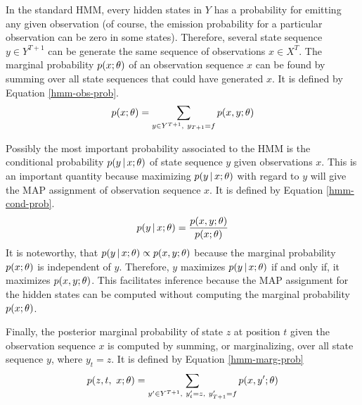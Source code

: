 In the standard HMM, every hidden states in $Y$ has a probability for
emitting any given observation (of course, the emission probability
for a particular observation can be zero in some states). Therefore,
several state sequence $y \in Y^{T+1}$ can be generate the same
sequence of observations $x \in X^T$. The marginal probability
$p(x\mbox{$ ; \, $}\theta)$ of an observation sequence $x$ can be found by
summing over all state sequences that could have generated $x$. It is
defined by Equation \eqref{hmm-obs-prob}.
\begin{equation}
p(x\parcond\theta) = \sum_{y \in Y^{T+1},\ y_{T+1} = f} p(x, y\parcond \theta)\label{hmm-obs-prob}
\end{equation}

Possibly the most important probability associated to the HMM is the
conditional probability $p(y\mbox{$ \, | \, $} x\mbox{$ ; \, $}\theta)$ of state sequence $y$
given observations $x$. This is an important quantity because
maximizing $p(y\mbox{$ \, | \, $} x\mbox{$ ; \, $}\theta)$ with regard to $y$ will give the MAP
assignment of observation sequence $x$. It is defined by Equation
\eqref{hmm-cond-prob}.
\begin{equation}
p(y\mbox{$ \, | \, $} x\mbox{$ ; \, $}\theta) = \frac{p(x,y\mbox{$ ; \, $}\theta)}{p(x\mbox{$ ; \, $}\theta)}\label{hmm-cond-prob}
\end{equation}
It is noteworthy, that $p(y\mbox{$ \, | \, $} x\mbox{$ ; \, $}\theta) \propto p(x,y\mbox{$ ; \, $}\theta)$ because the marginal probability $p(x\mbox{$ ; \, $}\theta)$ is independent of $y$. Therefore, $y$ maximizes $p(y\mbox{$ \, | \, $} x\mbox{$ ; \, $}\theta)$ if and only if, it maximizes $p(x,y\mbox{$ ; \, $}\theta)$. This facilitates inference because the MAP assignment for the hidden states can be computed without computing the marginal probability $p(x\mbox{$ ; \, $}\theta)$.

Finally, the posterior marginal probability of state $z$ at position $t$ given
the observation sequence $x$ is computed by summing, or marginalizing,
over all state sequence $y$, where $y_t = z$. It is defined by
Equation \eqref{hmm-marg-prob}
\begin{equation}
p(z, t,\ x\mbox{$ ; \, $} \theta) = \sum_{y' \in Y^{T+1},\ y'_t = z,\ y'_{T+1} = f} p(x, y'\mbox{$ ; \, $} \theta)\label{hmm-marg-prob}
\end{equation}

